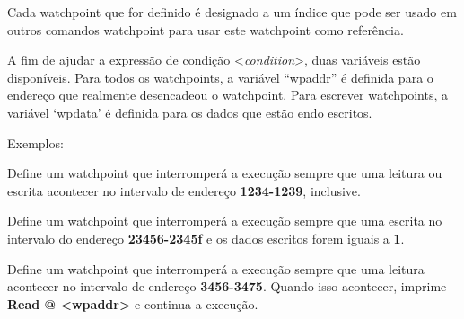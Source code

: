 \documentclass[letterpaper,10pt,brazil]{sphinxmanual}
\begin{document}
\begin{DUlineblock}{0em}
\item[] Cada watchpoint que for definido é designado a um índice que pode ser usado em outros comandos watchpoint para usar este watchpoint como referência.
\item[] A fim de ajudar a expressão de condição \textless{}\emph{condition}\textgreater{}, duas variáveis estão disponíveis. Para todos os watchpoints, a variável ``wpaddr'' é definida para o endereço que realmente desencadeou o watchpoint. Para escrever watchpoints, a variável `wpdata' é definida para os dados que estão endo escritos.
\item[] 
\item[] Exemplos:
\item[] 
\item[]
\begin{DUlineblock}{\DUlineblockindent}
\item[] 
\item[] 
\end{DUlineblock}
\item[] Define um watchpoint que interromperá a execução sempre que uma leitura ou escrita acontecer no intervalo de endereço \textbf{1234-1239}, inclusive.
\item[] 
\item[]
\begin{DUlineblock}{\DUlineblockindent}
\item[] 
\item[] 
\end{DUlineblock}
\item[] Define um watchpoint que interromperá a execução sempre que uma escrita no intervalo do endereço \textbf{23456-2345f} e os dados escritos forem iguais a \textbf{1}.
\item[] 
\item[]
\begin{DUlineblock}{\DUlineblockindent}
\item[] 
\item[] 
\end{DUlineblock}
\item[] Define um watchpoint que interromperá a execução sempre que uma leitura acontecer no intervalo de endereço \textbf{3456-3475}. Quando isso acontecer, imprime \textbf{Read @ \textless{}wpaddr\textgreater{}} e continua a execução.
\item[] 
\item[]

\end{DUlineblock}
\end{document}
